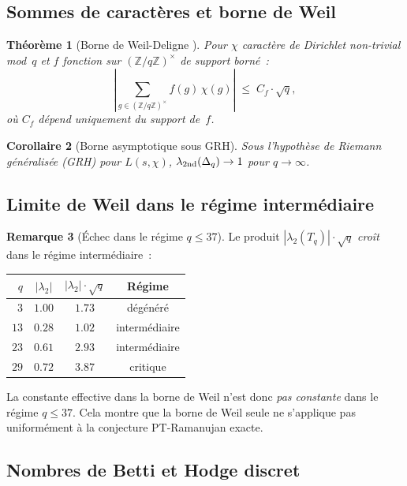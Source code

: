 \documentclass[11pt,a4paper]{article}
\newtheorem{theorem}{Théorème}[section]
\newtheorem{corollary}[theorem]{Corollaire}
\theoremstyle{definition}
\newtheorem{remark}[theorem]{Remarque}
\newcommand{\Z}{\mathbb{Z}}
\begin{document}
\subsection{Sommes de caractères et borne de Weil}

\begin{theorem}[Borne de Weil-Deligne {\upshape [PROUVÉ]}]
\label{thm:weil_bound}
Pour $\chi$ caractère de Dirichlet non-trivial mod~$q$ et $f$ fonction
sur $(\Z/q\Z)^\times$ de support borné~:
\begin{equation}
  \left|\sum_{g\in (\Z/q\Z)^\times} f(g)\,\chi(g)\right| \;\leq\;
  C_f \cdot \sqrt{q},
\end{equation}
où $C_f$ dépend uniquement du support de~$f$.
\end{theorem}

\begin{corollary}[Borne asymptotique sous GRH]
\label{cor:weil_asymptotic}
Sous l'hypothèse de Riemann généralisée (GRH) pour $L(s,\chi)$,
$\lambda_{\rm 2nd}(\Delta_q) \to 1$ pour $q\to\infty$.
\end{corollary}

\subsection{Limite de Weil dans le régime intermédiaire}

\begin{remark}[Échec dans le régime $q\leq 37$]
Le produit $|\lambda_2(T_q)|\cdot\sqrt q$ \emph{croît} dans le régime
intermédiaire~:
\begin{center}
\begin{tabular}{rccc}
\toprule
$q$ & $|\lambda_2|$ & $|\lambda_2|\cdot\sqrt q$ & Régime \\
\midrule
$3$  & $1.00$ & $1.73$ & dégénéré \\
$13$ & $0.28$ & $1.02$ & intermédiaire \\
$23$ & $0.61$ & $2.93$ & intermédiaire \\
$29$ & $0.72$ & $3.87$ & critique \\
\bottomrule
\end{tabular}
\end{center}
La constante effective dans la borne de Weil n'est donc \emph{pas
constante} dans le régime $q\leq 37$. Cela montre que la borne de
Weil seule ne s'applique pas uniformément à la conjecture
PT-Ramanujan exacte.
\end{remark}

\subsection{Nombres de Betti et Hodge discret}
\end{document}
